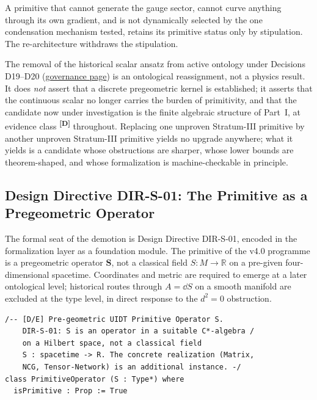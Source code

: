\documentclass[12pt,a4paper,twoside]{article}
\theoremstyle{plain}
\theoremstyle{definition}
\theoremstyle{remark}
\newcommand{\catmark}[1]{\textsuperscript{\textsf{\textbf{[#1]}}}}
\begin{document}
A primitive that cannot generate the gauge sector, cannot curve anything
through its own gradient, and is not dynamically selected by the one
condensation mechanism tested, retains its primitive status only by
stipulation. The re-architecture withdraws the stipulation.

\begin{pioverridebox}
The removal of the historical scalar ansatz from active ontology under Decisions D19--D20
(\hyperref[box:pi-decision-d20]{governance page}) is an ontological reassignment, not a physics
result. It does \emph{not} assert that a discrete pregeometric kernel is
established; it asserts that the continuous scalar no longer carries the
burden of primitivity, and that the candidate now under investigation is
the finite algebraic structure of Part~I, at evidence class \catmark{D}
throughout. Replacing one unproven Stratum-III primitive by another
unproven Stratum-III primitive yields no upgrade anywhere; what it yields
is a candidate whose obstructions are sharper, whose lower bounds are
theorem-shaped, and whose formalization is machine-checkable in principle.
\end{pioverridebox}

\subsection{Design Directive DIR-S-01: The Primitive as a Pregeometric Operator}
\label{subsec:dir-s-01}

The formal seat of the demotion is Design Directive DIR-S-01, encoded in
the formalization layer as a foundation module. The primitive of the v4.0
programme is a pregeometric operator $\mathbf S$, not a classical field
$S \colon M \to \mathbb R$ on a pre-given four-dimensional spacetime.
Coordinates and metric are required to emerge at a later ontological
level; historical routes through $A = \dd S$ on a smooth manifold are excluded at
the type level, in direct response to the $d^2 = 0$ obstruction.

\begin{lstlisting}
/-- [D/E] Pre-geometric UIDT Primitive Operator S.
    DIR-S-01: S is an operator in a suitable C*-algebra /
    on a Hilbert space, not a classical field
    S : spacetime -> R. The concrete realization (Matrix,
    NCG, Tensor-Network) is an additional instance. -/
class PrimitiveOperator (S : Type*) where
  isPrimitive : Prop := True
\end{lstlisting}
\end{document}
